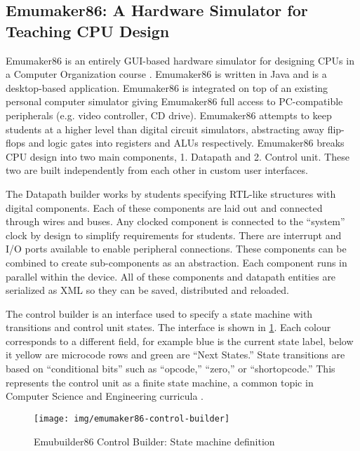 \subsection{Emumaker86: A Hardware Simulator for Teaching CPU Design}
\label{sec:review-emumaker86}

Emumaker86 is an entirely GUI-based hardware simulator for designing CPUs in a Computer Organization course \cite{Black2013}. Emumaker86 is written in Java and is a desktop-based application. Emumaker86 is integrated on top of an existing personal computer simulator giving Emumaker86 full access to PC-compatible peripherals (e.g. video controller, CD drive). Emumaker86 attempts to keep students at a higher level than digital circuit simulators, abstracting away flip-flops and logic gates into registers and ALUs respectively. Emumaker86 breaks CPU design into two main components, 1. Datapath and 2. Control unit. These two are built independently from each other in custom user interfaces. 

The Datapath builder works by students specifying RTL-like structures with digital components. Each of these components are laid out and connected through wires and buses. Any clocked component is connected to the ``system'' clock by design to simplify requirements for students. There are interrupt and I/O ports available to enable peripheral connections. These components can be combined to create sub-components as an abstraction. Each component runs in parallel within the device. All of these components and datapath entities are serialized as XML so they can be saved, distributed and reloaded. 

The control builder is an interface used to specify a state machine with transitions and control unit states. The interface is shown in \cref{fig:emumaker86-control-builder}. Each colour corresponds to a different field, for example blue is the current state label, below it yellow are microcode rows and green are ``Next States.'' State transitions are based on ``conditional bits'' such as ``opcode,'' ``zero,'' or ``shortopcode.'' This represents the control unit as a finite state machine, a common topic in Computer Science and Engineering curricula \cite{cec2016}. 

\begin{figure}[bp!]
    \centering
    \texttt{[image: img/emumaker86-control-builder]}
    \caption{Emubuilder86 Control Builder: State machine definition \cite[p.~325]{Black2013}}
    \label{fig:emumaker86-control-builder}
\end{figure}

